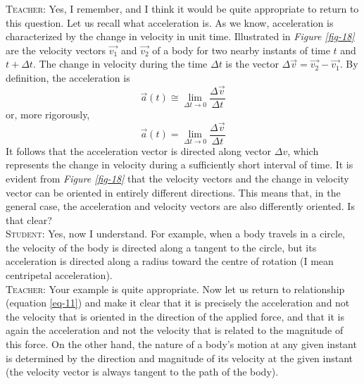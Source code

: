 \documentclass[a4paper,sfsidenotes]{tufte-book}
\begin{document}
\textsc{Teacher:} Yes, I remember, and I think it would be quite appropriate to return to this question. Let us recall what acceleration is. As we know, acceleration is characterized by the change in velocity in unit time. Illustrated in \emph{Figure \ref{fig-18}} are the velocity vectors $\vec{v_{1}}$ and $\vec{v_{2}}$ of a body for two nearby instants of time $t$ and $t+\Delta t$. The change in velocity during the time $\Delta t$ is the vector $\Delta \vec{v} =\vec{v_{2}} - \vec{v_{1}}$. By definition, the acceleration is
\begin{equation}
\vec{a}(t) \cong \lim_{\Delta t \rightarrow 0}\frac{\Delta \vec{v}}{\Delta t}
\label{eq-12}
\end{equation}
or, more rigorously,
\begin{equation}
\vec{a}(t) = \lim_{\Delta t \rightarrow 0}\frac{\Delta \vec{v}}{\Delta t}
\label{eq-13}
\end{equation}
It follows that the acceleration vector is directed along vector $\Delta v$, which represents the change in velocity during a sufficiently short interval of time. It is evident from \emph{Figure \ref{fig-18}} that the velocity vectors and the change in velocity vector can be oriented in entirely different directions. This means that, in the general case, the acceleration and velocity vectors are also differently oriented. Is that clear?\\
\textsc{Student:} Yes, now I understand. For example, when a body travels in a circle, the velocity of the body is directed along a tangent to the circle, but its acceleration is directed along
a radius toward the centre of rotation (I mean centripetal acceleration).\\
\textsc{Teacher:} Your example is quite appropriate. Now let us return to relationship (equation \ref{eq-11}) and make it clear that it is precisely the acceleration and not the velocity that is oriented
in the direction of the applied force, and that it is again the acceleration and not the velocity that is related to the magnitude of this force. On the other hand, the nature of a body's motion at any given instant is determined by the direction and magnitude of its velocity at the given instant (the velocity vector is always tangent to the path of the body).
\end{document}
